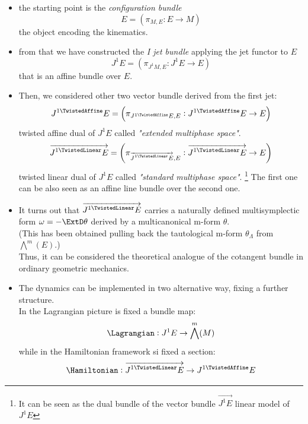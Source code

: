 \documentclass[a4paper,12pt,fleqn]{scrartcl}  %
\renewcommand{\AffDualJet}{ J^{1 \TwistedAffine}E }
\renewcommand{\LinDualJet}{ \overrightarrow{J^{1 \TwistedLinear}E} }
\begin{document}
\begin{itemize}
 \item the starting point is the \emph{configuration bundle} 
 	\begin{displaymath}
 		E = \left( \pi_{M,E} : E\rightarrow M \right)
 	\end{displaymath}
 	the object encoding the kinematics.
 \item from that we have constructed the \emph{I jet bundle} applying the jet functor to $E$ 
 	\begin{displaymath}
 	J^1E = \left( \pi_{J^1 M,E} : J^1 E\rightarrow E \right)
 	\end{displaymath} 
 	that is an affine bundle over $E$.
 \item Then, we considered other two vector bundle derived from the first jet:
 	\begin{displaymath}
 	\AffDualJet  = \left( \pi_{ \AffDualJet ,E} : \AffDualJet  \rightarrow E \right)
 	\end{displaymath}
	twisted affine dual of $J^1E$ called \emph{"extended multiphase space"}.
	\begin{displaymath}
		\LinDualJet  = \left( \pi_{ \LinDualJet ,E} : \LinDualJet \rightarrow E \right)
	\end{displaymath}
	twisted linear dual of $J^1 E$ called \emph{"standard multiphase space"}. \footnote{It can be seen as the dual bundle of the vector bundle $\vec{J^1E}$ linear model of $J^1E$}
	The first one can be also seen as an affine line bundle over the second one.
	
\item It turns out that  $\LinDualJet $ carries a naturally defined multisymplectic form $\omega = -\ExtD \theta$ derived by a multicanonical m-form $\theta$. \\
	(This has been obtained pulling back the tautological m-form $\theta_\Lambda$ from $\bigwedge^m (E)$.) \\
	Thus, it can be considered the theoretical analogue of the cotangent bundle in ordinary geometric mechanics.
	
\item The dynamics can be implemented in two alternative way, fixing a further structure.\\
	In the Lagrangian picture is fixed a bundle map:
	\begin{displaymath}
		\Lagrangian : J^1 E \rightarrow \bigwedge^m (M)
	\end{displaymath}
	while in the Hamiltonian framework si fixed a section:
	\begin{displaymath}
		\Hamiltonian : \LinDualJet \rightarrow \AffDualJet
	\end{displaymath}


\end{itemize}
\end{document}
